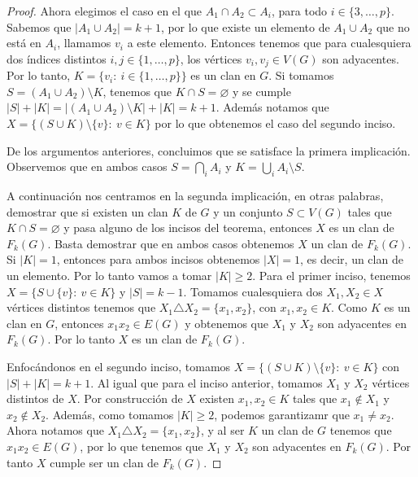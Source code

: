 \begin{proof}
    Ahora elegimos el caso en el que $A_1 \cap A_2 \subset A_i$, para todo $i\in
    \{3, \dots, p\}$. Sabemos que $|A_1 \cup A_2| = k+1$, por lo que existe un
    elemento de $A_1 \cup A_2$ que no est\'a en $A_i$, llamamos $v_i$ a este
    elemento. Entonces tenemos que para cualesquiera dos \'indices distintos $i,
    j \in \{1, \dots, p\}$, los v\'ertices $v_i, v_j \in V(G)$ son adyacentes.
    Por lo tanto, $K= \{v_i\colon\ i \in \{1, \dots, p\}\}$ es un clan en $G$. Si
    tomamos $S= (A_1 \cup A_2)\setminus K$, tenemos que $K \cap S = \varnothing$
    y se cumple $|S| + |K|= |(A_1 \cup A_2)\setminus K| + |K| = k+1$. Adem\'as
    notamos que $X = \{(S \cup K)\setminus \{v\}\colon\ v\in K\}$ por lo que
    obtenemos el caso del segundo inciso.

    De los argumentos anteriores, concluimos que se satisface la primera
    implicaci\'on. Observemos que en ambos casos $S = \bigcap\limits_{i} A_i$ y
    $K = \bigcup\limits_{i} A_i \setminus S$.
        
    A continuaci\'on nos centramos en la segunda implicaci\'on, en otras
    palabras, demostrar que si existen un clan $K$ de $G$ y un conjunto $S
    \subset V(G)$ tales que $K \cap S = \varnothing$ y pasa alguno de los
    incisos del teorema, entonces $X$ es un clan de $F_k(G)$. Basta demostrar
    que en ambos casos obtenemos $X$ un clan de $F_k(G)$. Si $|K| =1$, entonces
    para ambos incisos obtenemos $|X| =1$, es decir, un clan de un elemento. Por
    lo tanto vamos a tomar $|K| \geq 2$. Para el primer inciso, tenemos $X = \{S
    \cup \{v\}\colon\ v \in K\}$ y $|S| = k-1$. Tomamos cualesquiera dos $X_1,
    X_2 \in X$ v\'ertices distintos tenemos que $X_1 \triangle X_2 =\{x_1,
    x_2\}$, con $x_1, x_2 \in K$. Como $K$ es un clan en $G$, entonces $x_1x_2
    \in E(G)$ y obtenemos que $X_1$ y $X_2$ son adyacentes en $F_k(G)$. Por lo
    tanto $X$ es un clan de $F_k(G)$.

    Enfoc\'andonos en el segundo inciso, tomamos $X = \{(S\cup K) \setminus
    \{v\}\colon\ v \in K \}$ con $|S| + |K| = k+1$. Al igual que para el inciso
    anterior, tomamos $X_1$ y $X_2$ v\'ertices distintos de $X$. Por
    construcci\'on de $X$ existen $x_1, x_2 \in K$ tales que $x_1 \notin X_1$ y
    $x_2 \notin X_2$. Adem\'as, como tomamos $|K| \geq 2$, podemos garantizamr
    que $x_1 \neq x_2$. Ahora notamos que $X_1 \triangle X_2 = \{x_1, x_2\}$, y
    al ser $K$ un clan de $G$ tenemos que $x_1x_2 \in E(G)$, por lo que tenemos
    que $X_1$ y $X_2$ son adyacentes en $F_k(G)$. Por tanto $X$ cumple ser un
    clan de $F_k(G)$.
\end{proof}
    
